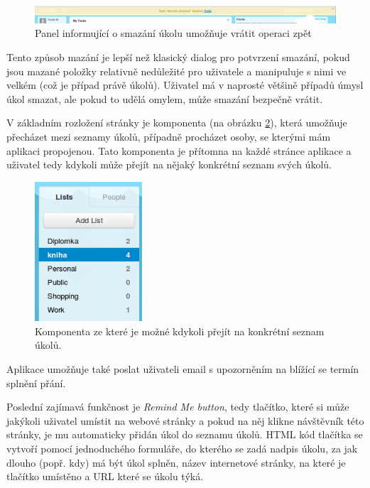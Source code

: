 \begin{figure}[htb]
\begin{center}
\includegraphics[width=130mm]{./pictures/astrid-undo.png}
\caption{Panel informující o smazání úkolu umožňuje vrátit operaci zpět}
\label{fig:astrid-undo}
\end{center}
\end{figure}


Tento způsob mazání je lepší než klasický dialog pro potvrzení smazání, pokud jsou mazané položky relativně nedůležité pro uživatele a manipuluje s nimi ve velkém (což je případ právě úkolů). Uživatel má v naprosté většině případů úmysl úkol smazat, ale pokud to udělá omylem, může smazání bezpečně vrátit. 

V základním rozložení stránky je komponenta (na obrázku \ref{fig:astrid-tasklist}), která umožňuje přecházet mezi seznamy úkolů, případně procházet osoby, se kterými mám aplikaci propojenou. Tato komponenta je přítomna na každé stránce aplikace a uživatel tedy kdykoli může přejít na nějaký konkrétní seznam svých úkolů.

\begin{figure}[htb]
\begin{center}
\includegraphics[width=40mm]{./pictures/astrid-tasklist.png}
\caption{Komponenta ze které je možné kdykoli přejít na konkrétní seznam úkolů.}
\label{fig:astrid-tasklist}
\end{center}
\end{figure}

Aplikace umožňuje také poslat uživateli email s upozorněním na blížící se termín splnění přání.

Poslední zajímavá funkčnost je \emph{Remind Me button}, tedy tlačítko, které si může jakýkoli uživatel umístit na webové stránky a pokud na něj klikne návštěvník této stránky, je mu automaticky přidán úkol do seznamu úkolů. HTML kód tlačítka se vytvoří pomocí jednoduchého formuláře, do kterého se zadá nadpis úkolu, za jak dlouho (popř. kdy) má být úkol splněn, název internetové stránky, na které je tlačítko umístěno a URL které se úkolu týká.

